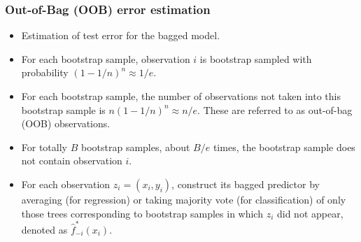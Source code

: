 \documentclass{beamer}
\begin{document}
                    \begin{frame}
                    	\frametitle{Out-of-Bag (OOB) error estimation  }
                    	\begin{itemize}
                    		\item  Estimation of test error for the bagged model.	
                    		
                    		\item  For each bootstrap sample, observation $i$ is bootstrap sampled with probability $(1-1/n)^n \approx 1/e $.
                    		\item   For each bootstrap sample,  the number of observations not taken into 
                    		 this bootstrap sample is $n (1-1/n)^n \approx n/e$. These are referred to 
                    		 as out-of-bag (OOB) observations.
                    		\item For totally $B$ bootstrap samples, about $B/e$ times, the bootstrap sample does not contain observation $i$.
                    		\item  For each observation $z_i = (x_i,y_i)$, construct its bagged predictor by averaging (for regression) or taking majority vote (for classification) of only those trees corresponding to bootstrap samples in which $z_i$ did not appear, denoted as $\hat f^*_{-i}(x_i)$.
                    		
                    		
                    	\end{itemize}
                    \end{frame} 
\end{document}
